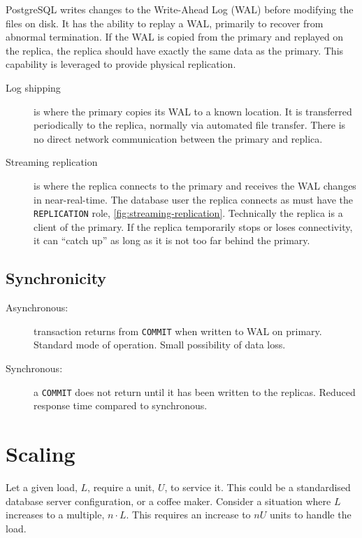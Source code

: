 \documentclass[slides]{pgnotes}
\begin{document}
PostgreSQL writes changes to the Write-Ahead Log (WAL) before modifying the files on disk.
It has the ability to replay a WAL, primarily to recover from abnormal termination.
If the WAL is copied from the primary and replayed on the replica, the replica should have exactly the same data as the primary.
This capability is leveraged to provide physical replication.
\begin{description}
\item[Log shipping] is where the primary copies its WAL to a known location.
  It is transferred periodically to the replica, normally via automated file transfer.
  There is no direct network communication between the primary and replica.
\item[Streaming replication] is where the replica connects to the primary and receives the WAL changes in near-real-time.
  The database user the replica connects as must have the \texttt{REPLICATION} role, \autoref{fig:streaming-replication}.
  Technically the replica is a client of the primary.
  If the replica temporarily stops or loses connectivity, it can ``catch up'' as long as it is not too far behind the primary.
\end{description}


\subsection{Synchronicity}

\begin{description}
\item[Asynchronous:] transaction returns from \texttt{COMMIT} when written to WAL on primary. Standard mode of operation. Small possibility of data loss.
\item[Synchronous:] a \texttt{COMMIT} does not return until it has been written to the replicas. Reduced response time compared to synchronous.
\end{description}

\section{Scaling}

Let a given load, $L$, require a unit, $U$, to service it. 
This could be a standardised database server configuration, or a coffee maker.
Consider a situation where $L$ increases to a multiple, $n \cdot L$.
This requires an increase to $nU$ units to handle the load.
\end{document}
